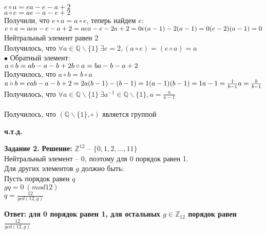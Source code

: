 \documentclass[12pt,a4paper]{scrartcl}
\begin{document}
	 $e \circ a = ea - e - a + 2$\\
	 $a \circ e = ae - a - e + 2$\\
	 Получили, что $e \circ a = a \circ e$, теперь найдем $e$: \\
	 $e \circ a = a \\
	 ea - e - a + 2 = a \\
	 ea - e - 2a + 2 = 0 \\
	 e(a - 1) - 2(a - 1) = 0 \\
	 (e - 2)(a - 1) = 0$\\
	 Нейтральный элемент равен 2 \\
	 Получилось, что $\forall a \in \mathbb{Q} \backslash \{1\}~\exists e = 2, (a \circ e) = (e \circ a) = a$ \\
	 $\bullet$ Обратный элемент: \\
	 $a \circ b = ab - a - b + 2 \\
	 b \circ a = ba - b - a + 2$ \\
	 Получилось, что $a \circ b = b \circ a$ \\
	 $a \circ b = e \\
	 ab - a - b + 2 = 2 \\
	 a(b - 1) - (b - 1) = 1 \\
	 (a - 1)(b - 1) = 1 \\
	 a - 1 = \frac{1}{b - 1} \\
	 a = \frac{b}{b - 1}$ \\
	 Получилось, что $\forall a \in \mathbb{Q} \backslash \{1\}~\exists a^{-1} \in \mathbb{Q} \backslash \{1\}, a = \frac{a}{a - 1}$ \\
	 \\
	 Получилось, что $(\mathbb{Q} \backslash \{1\}, \circ)$ является группой 
	\begin{flushright}	
		\textbf{ч.т.д.}
	\end{flushright}
	\textbf{Задание 2.} 
	\newline
	\textbf{Решение:} 
	\newline
	\indent
	$\mathbb{Z}^{12}$ -- $\{0, 1, 2, ..., 11\}$\\
	Нейтральный элемент -- 0, поэтому для 0 порядок равен 1.\\
	Для других элементов $g$ должно быть: \\
	Пусть порядок равен $q$ \\
	$gq = 0~(mod 12)$ \\
	$q = \frac{12}{gcd(12, g)}$
	\begin{flushright}
		\textbf{Ответ: для 0 порядок равен 1, для остальных $g \in \mathbb{Z}_{12}$ порядок равен$\frac{12}{gcd(12, g)}$}
	\end{flushright}
\end{document}
